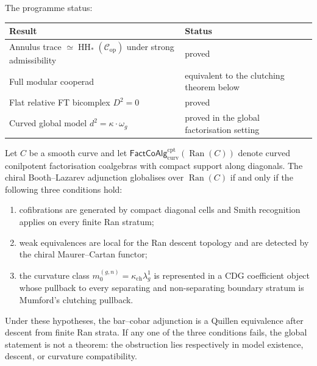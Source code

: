 \documentclass[11pt]{article}
\newcommand{\cC}{\mathcal{C}}
\newcommand{\Ran}{\operatorname{Ran}}
\newcommand{\HH}{\operatorname{HH}}
\begin{document}
The programme status:

\begin{center}
\small
\renewcommand{\arraystretch}{1.15}
\begin{tabular}{@{}ll@{}}
\textbf{Result} & \textbf{Status} \\
\hline
Annulus trace $\simeq \HH_*(\cC_{\mathrm{op}})$ under strong
  admissibility & proved \\[3pt]
Full modular cooperad & equivalent to the clutching theorem below \\[3pt]
Flat relative FT bicomplex $D^2 = 0$ & proved \\[3pt]
Curved global model $d^2 = \kappa \cdot \omega_g$ & proved in the
  global factorisation setting
\end{tabular}
\end{center}

\begin{theorem}
\label{thm:global-ran-model-descent-criterion}
Let $C$ be a smooth curve and let
$\mathsf{FactCoAlg}^{\mathrm{cpt}}_{\mathrm{curv}}(\Ran(C))$ denote
curved conilpotent factorisation coalgebras with compact
support along diagonals.  The chiral Booth--Lazarev adjunction
globalises over $\Ran(C)$ if and only if the following three
conditions hold:
\begin{enumerate}[label=\textup{(\roman*)},nosep]
\item cofibrations are generated by compact diagonal cells and
Smith recognition applies on every finite Ran stratum;
\item weak equivalences are local for the Ran descent topology
and are detected by the chiral Maurer--Cartan functor;
\item the curvature class
$m_0^{(g,n)}=\kappa_{\mathrm{ch}}\lambda_g^1$ is represented in
a CDG coefficient object whose pullback to every separating and
non-separating boundary stratum is Mumford's clutching pullback.
\end{enumerate}
Under these hypotheses, the bar--cobar adjunction is a Quillen
equivalence after descent from finite Ran strata.  If any one of
the three conditions fails, the global statement is not a
theorem: the obstruction lies respectively in model existence,
descent, or curvature compatibility.
\end{theorem}
\end{document}
